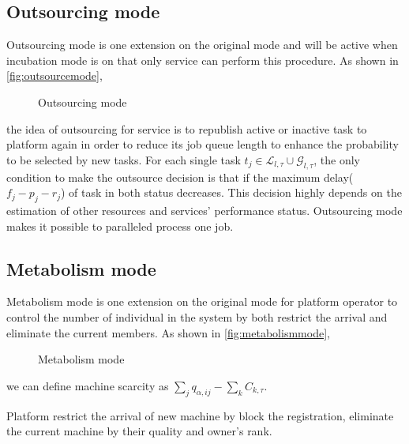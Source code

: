 \subsection{Outsourcing mode} %
\label{sub:outsource_mode}
Outsourcing mode is one extension on the original mode and will be active when incubation mode is on that only service can perform this procedure. As shown in \autoref{fig:outsourcemode},
\begin{figure}[htbp]
    \centering
    \resizebox{0.7\textwidth}{!}{}
    \caption{Outsourcing mode}
    \label{fig:outsourcemode}
\end{figure}
the idea of outsourcing for service is to republish active or inactive task to platform again in order to reduce its job queue length to enhance the probability to be selected by new tasks. For each single task $t_j\in\mathcal{L}_{l,\tau}\cup\mathcal{G}_{l,\tau}$, the only condition to make the outsource decision is that if the maximum delay($f_j-p_j-r_j$) of task in both status decreases. This decision highly depends on the estimation of other resources and services' performance status. Outsourcing mode makes it possible to paralleled process one job.

\subsection{Metabolism mode} %
\label{sub:metabolism mode}
Metabolism mode is one extension on the original mode for platform operator to control the number of individual in the system by both restrict the arrival and eliminate the current members. As shown in \autoref{fig:metabolismmode},
\begin{figure}[htbp]
    \centering
    \resizebox{0.85\textwidth}{!}{}
    \caption{Metabolism mode}
    \label{fig:metabolismmode}
\end{figure}
we can define machine scarcity as $\sum_jq_{\alpha,ij} - \sum_kC_{k,\tau}$.

Platform restrict the arrival of new machine by block the registration, eliminate the current machine by their quality and owner's rank.


